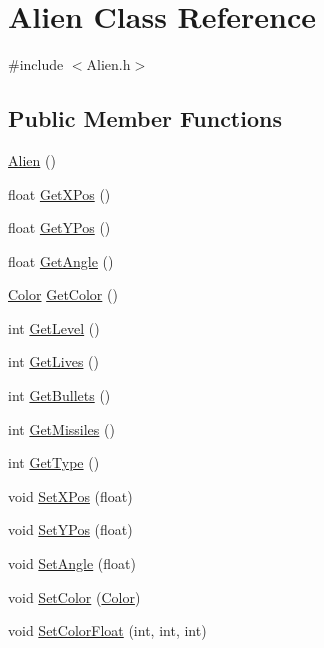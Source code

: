 \hypertarget{classAlien}{\section{Alien Class Reference}
\label{classAlien}
}


{\ttfamily \#include $<$Alien.\-h$>$}

\subsection*{Public Member Functions}
\begin{DoxyCompactItemize}
\item 
\hyperlink{classAlien_af4b2bc9e4071152d6aead3be07fa9690}{Alien} ()
\item 
float \hyperlink{classAlien_a40d01d7934a988b200efa5d192f0c041}{Get\-X\-Pos} ()
\item 
float \hyperlink{classAlien_ad98b811292fb223efce8e42ab774857c}{Get\-Y\-Pos} ()
\item 
float \hyperlink{classAlien_ab154af67eeeea07f96d03e6eff716bee}{Get\-Angle} ()
\item 
\hyperlink{classColor}{Color} \hyperlink{classAlien_a973ec4ad00d90e2b10264d9d1394a7ec}{Get\-Color} ()
\item 
int \hyperlink{classAlien_a50df27fb530e0aa49eabca1e1a56e5d7}{Get\-Level} ()
\item 
int \hyperlink{classAlien_a115861c98c20482436614c479894968c}{Get\-Lives} ()
\item 
int \hyperlink{classAlien_a007ec6561d0361e872062d5e4da6ecd5}{Get\-Bullets} ()
\item 
int \hyperlink{classAlien_a8324ee6950df510211cfcbc7268a25de}{Get\-Missiles} ()
\item 
int \hyperlink{classAlien_a1838252ed547cfb0d52f097e37017988}{Get\-Type} ()
\item 
void \hyperlink{classAlien_a80653749b30d97b3442a963d49470c7f}{Set\-X\-Pos} (float)
\item 
void \hyperlink{classAlien_aad8bbe5b3eea716fd2218ba21c5d1e44}{Set\-Y\-Pos} (float)
\item 
void \hyperlink{classAlien_ae930da13ce098cb677ead054bc71f56e}{Set\-Angle} (float)
\item 
void \hyperlink{classAlien_aabdbc28fd6b473e37f07ef7e806a1393}{Set\-Color} (\hyperlink{classColor}{Color})
\item 
void \hyperlink{classAlien_a1d39ab82b1be707802b8ab846ff2278a}{Set\-Color\-Float} (int, int, int)
\item 

\end{DoxyCompactItemize}
